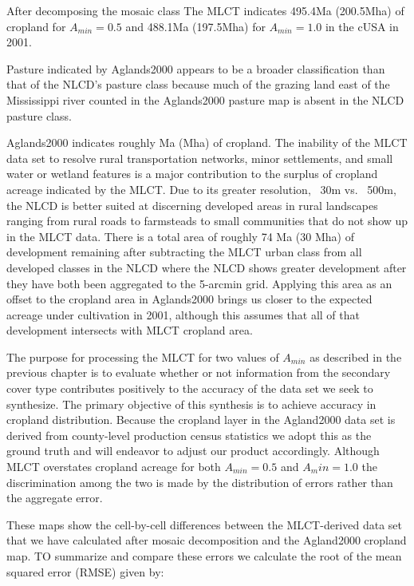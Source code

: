 After decomposing the mosaic class The MLCT indicates
495.4Ma (200.5Mha) of cropland for
$A_{min}=0.5$ and 488.1Ma (197.5Mha) for
$A_{min}=1.0$ in the cUSA in 2001. 

Pasture indicated by Aglands2000 appears to be a broader
classification than that of the NLCD's pasture class because much of
the grazing land east of the Mississippi river counted in the
Aglands2000 pasture map is absent in the NLCD pasture class.

Aglands2000 indicates roughly
Ma (Mha) of cropland.  The
inability of the MLCT data set to resolve rural transportation
networks, minor settlements, and small water or wetland features is a
major contribution to the surplus of cropland acreage indicated by the
MLCT.  Due to its greater resolution, ~30m vs. ~500m, the NLCD is
better suited at discerning developed areas in rural landscapes
ranging from rural roads to farmsteads to small communities that do
not show up in the MLCT data. There is a total area of roughly 74 Ma
(30 Mha) of development remaining after subtracting the MLCT urban
class from all developed classes in the NLCD where the NLCD shows
greater development after they have both been aggregated to the
5-arcmin grid. Applying this area as an offset to the cropland area in
Aglands2000 brings us closer to the expected acreage under cultivation
in 2001, although this assumes that all of that development intersects
with MLCT cropland area.


The purpose for processing the MLCT for two values of $A_{min}$ as
described in the previous chapter is to evaluate whether or not
information from the secondary cover type contributes positively to
the accuracy of the data set we seek to synthesize.  The primary
objective of this synthesis is to achieve accuracy in cropland
distribution.  Because the cropland layer in the Agland2000 data set
is derived from county-level production census statistics we adopt
this as the ground truth and will endeavor to adjust our product
accordingly.  Although MLCT overstates cropland acreage for both
$A_{min}=0.5$ and $A_min=1.0$ the discrimination among the two is made
by the distribution of errors rather than the aggregate error.


These maps show the cell-by-cell differences between the MLCT-derived
data set that we have calculated after mosaic decomposition and the
Agland2000 cropland map.  TO summarize and compare these errors we
calculate the root of the mean squared error (RMSE) given by:

